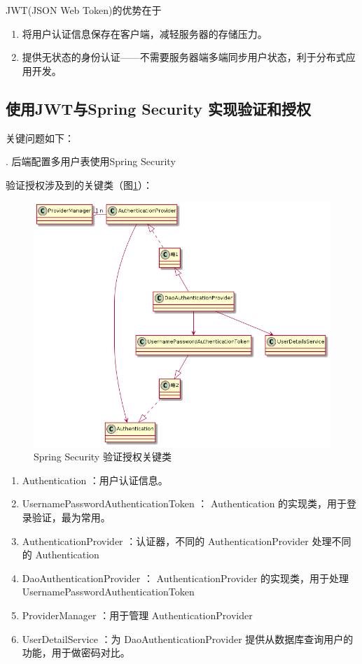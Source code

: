 JWT(JSON Web Token)的优势在于
\begin{enumerate}
  \item 将用户认证信息保存在客户端，减轻服务器的存储压力。
  \item 提供无状态的身份认证——不需要服务器端多端同步用户状态，利于分布式应用开发。\cite{.2019h}
\end{enumerate}


\subsection{使用JWT与Spring Security 实现验证和授权}

\noindent 关键问题如下：

. 后端配置多用户表使用Spring Security

验证授权涉及到的关键类（图\ref{SpringSecurity}）：
\begin{figure}[htbp]
  \centering
  \includegraphics[scale = 0.5]{out/uml/类图/Spring Security/SpringSecurity验证/SpringSecurity验证.png}
  \caption{\song\wuhao Spring Security 验证授权关键类}
  \label{SpringSecurity}
\end{figure}
\begin{enumerate}
  \item  Authentication ：用户认证信息。
  \item  UsernamePasswordAuthenticationToken ： Authentication 的实现类，用于登录验证，最为常用。
  \item  AuthenticationProvider ：认证器，不同的 AuthenticationProvider  处理不同的  Authentication
  \item  DaoAuthenticationProvider ： AuthenticationProvider 的实现类，用于处理 UsernamePasswordAuthenticationToken
  \item  ProviderManager ：用于管理 AuthenticationProvider
  \item  UserDetailService ：为 DaoAuthenticationProvider 提供从数据库查询用户的功能，用于做密码对比。
\end{enumerate}
